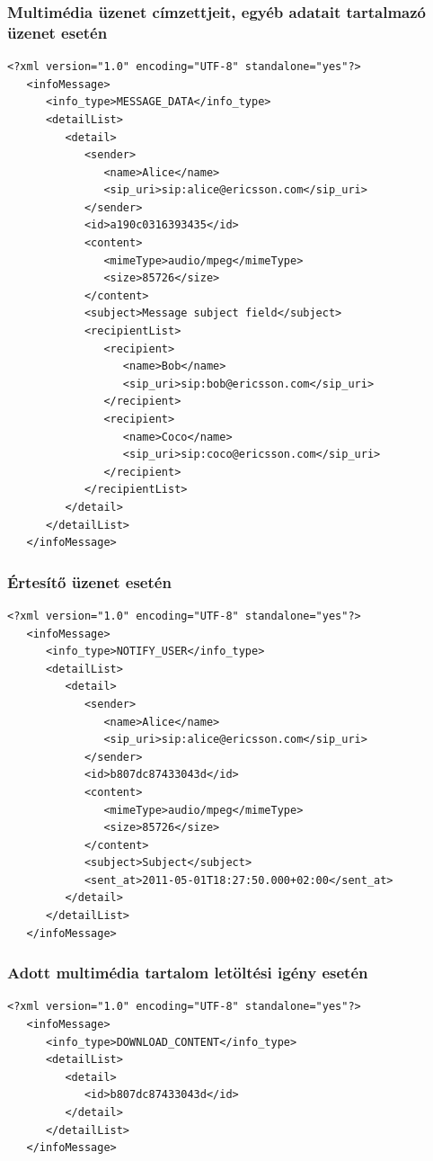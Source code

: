 \subsubsection*{Multimédia üzenet címzettjeit, egyéb adatait tartalmazó üzenet esetén}
\fontsize{10}{10}
\begin{verbatim}
<?xml version="1.0" encoding="UTF-8" standalone="yes"?>
   <infoMessage>
      <info_type>MESSAGE_DATA</info_type>
      <detailList>
         <detail>
            <sender>
               <name>Alice</name>
               <sip_uri>sip:alice@ericsson.com</sip_uri>
            </sender>
            <id>a190c0316393435</id>
            <content>
               <mimeType>audio/mpeg</mimeType>
               <size>85726</size>
            </content>
            <subject>Message subject field</subject>
            <recipientList>
               <recipient>
                  <name>Bob</name>
                  <sip_uri>sip:bob@ericsson.com</sip_uri>
               </recipient>
               <recipient>
                  <name>Coco</name>
                  <sip_uri>sip:coco@ericsson.com</sip_uri>
               </recipient>
            </recipientList>
         </detail>
      </detailList>
   </infoMessage>
\end{verbatim}
\fontsize{12}{12} 

\subsubsection*{Értesítő üzenet esetén}
\fontsize{10}{10}
\begin{verbatim}
<?xml version="1.0" encoding="UTF-8" standalone="yes"?>
   <infoMessage>
      <info_type>NOTIFY_USER</info_type>
      <detailList>
         <detail>
            <sender>
               <name>Alice</name>
               <sip_uri>sip:alice@ericsson.com</sip_uri>
            </sender>
            <id>b807dc87433043d</id>
            <content>
               <mimeType>audio/mpeg</mimeType>
               <size>85726</size>
            </content>
            <subject>Subject</subject>
            <sent_at>2011-05-01T18:27:50.000+02:00</sent_at>
         </detail>
      </detailList>
   </infoMessage>
\end{verbatim}
\fontsize{12}{12} 

\subsubsection*{Adott multimédia tartalom letöltési igény esetén}
\fontsize{10}{10}
\begin{verbatim}
<?xml version="1.0" encoding="UTF-8" standalone="yes"?>
   <infoMessage>
      <info_type>DOWNLOAD_CONTENT</info_type>
      <detailList>
         <detail>
            <id>b807dc87433043d</id>
         </detail>
      </detailList>
   </infoMessage>
\end{verbatim}
\fontsize{12}{12} 

